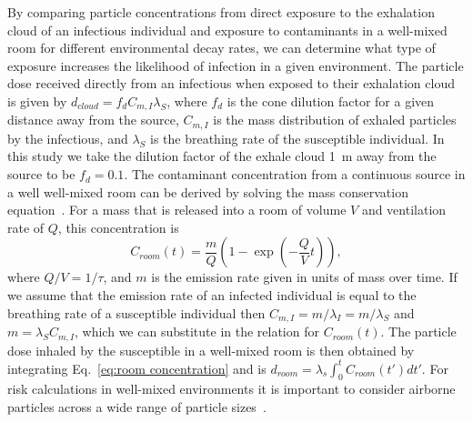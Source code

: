 \documentclass[preprint]{elsarticle}
\begin{document}
By comparing particle concentrations from direct exposure to the exhalation cloud of an infectious individual and exposure to contaminants in a well-mixed room for different environmental decay rates, we can determine what type of exposure increases the likelihood of infection in a given environment.
The particle dose received directly from an infectious when exposed to their exhalation cloud is given by $d_{cloud}=f_{d}C_{m,I}\lambda_{S}$, where $f_{d}$ is the cone dilution factor for a given distance away from the source, $C_{m,I}$ is the mass distribution of exhaled particles by the infectious, and $\lambda_{S}$ is the breathing rate of the susceptible individual. In this study we take the dilution factor of the exhale cloud \SI{1}{\meter} away from the source to be $f_{d}=0.1$.
The contaminant concentration from a continuous source in a well well-mixed room can be derived by solving the mass conservation equation~\cite{Nazaroff2008}. For a mass that is released into a room of volume $V$ and ventilation rate of $Q$, this concentration is \begin{equation}
    C_{room}(t) = \frac{m}{Q}\left(1-\exp\left(-\frac{Q}{V}t\right)\right),
    \label{eq:room concentration}
\end{equation}
where $Q/V=1/\tau$, and $m$ is the emission rate given in units of mass over time.
If we assume that the emission rate of an infected individual is equal to the breathing rate of a susceptible individual then $C_{m,I}=m/\lambda_{I}=m/\lambda_{S}$ and $m=\lambda_{S}C_{m,I}$, which we can substitute in the relation for $C_{room}(t)$.
The particle dose inhaled by the susceptible in a well-mixed room is then obtained by integrating Eq.~\ref{eq:room concentration} and is $d_{room} = \lambda_{s} \int_{0}^{t} C_{room}(t') dt'$.
For risk calculations in well-mixed environments it is important to consider airborne particles across a wide range of particle sizes~\cite{Pohlker2021, Chong_2021, Wang2021}.
\end{document}
